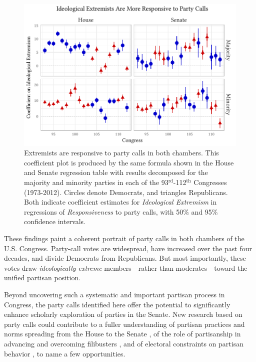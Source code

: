 \documentclass[12pt]{article}
\begin{document}
\begin{figure}[t]
\centering
\includegraphics{extremism-responsiveness.pdf}
\caption{Extremists are responsive to party calls in both chambers.
This coefficient plot is produced by the same formula shown in the House and Senate regression table with results decomposed for the majority and minority parties in each of the 93$^{\text{rd}}$-112$^{\text{th}}$ Congresses (1973-2012).
Circles denote Democrats, and triangles Republicans.
Both indicate coefficient estimates for \textit{Ideological Extremism} in regressions of \emph{Responsiveness} to party calls, with 50\% and 95\% confidence intervals.
\label{fig-extremism-responsiveness}}
\end{figure}

These findings paint a coherent portrait of party calls in both chambers of the U.S. Congress. Party-call votes are widespread, have increased over the past four decades, and divide Democrats from Republicans. But most importantly, these votes draw \emph{ideologically extreme} members---rather than moderates---toward the unified partisan position.

Beyond uncovering such a systematic and important partisan process in Congress, the party calls identified here offer the potential to significantly enhance scholarly exploration of parties in the Senate. New research based on party calls could contribute to a fuller understanding of partisan practices and norms spreading from the House to the Senate \citep[e.g.,][]{Theriault:2013}, of the role of partisanship in advancing and overcoming filibusters \citep[e.g.,][]{Wawro:2004}, and of electoral constraints on partisan behavior \citep[e.g.,][]{Levitt:1996}, to name a few opportunities.
\end{document}
